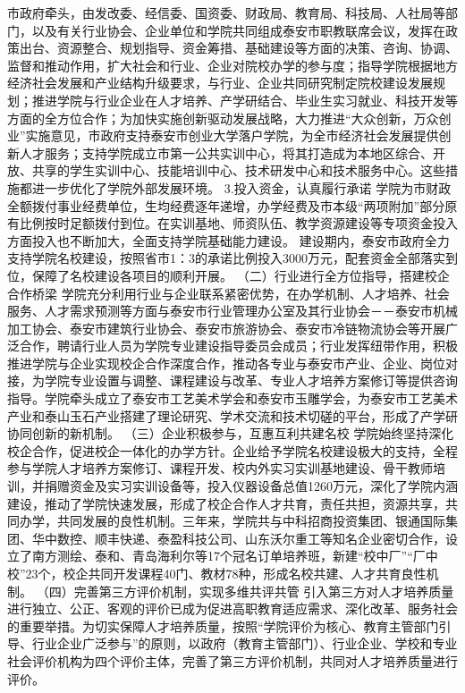 市政府牵头，由发改委、经信委、国资委、财政局、教育局、科技局、人社局等部门，以及有关行业协会、企业单位和学院共同组成泰安市职教联席会议，发挥在政策出台、资源整合、规划指导、资金筹措、基础建设等方面的决策、咨询、协调、监督和推动作用，扩大社会和行业、企业对院校办学的参与度；指导学院根据地方经济社会发展和产业结构升级要求，与行业、企业共同研究制定院校建设发展规划；推进学院与行业企业在人才培养、产学研结合、毕业生实习就业、科技开发等方面的全方位合作；为加快实施创新驱动发展战略，大力推进“大众创新，万众创业”实施意见，市政府支持泰安市创业大学落户学院，为全市经济社会发展提供创新人才服务；支持学院成立市第一公共实训中心，将其打造成为本地区综合、开放、共享的学生实训中心、技能培训中心、技术研发中心和技术服务中心。这些措施都进一步优化了学院外部发展环境。
3.投入资金，认真履行承诺
学院为市财政全额拨付事业经费单位，生均经费逐年递增，办学经费及市本级“两项附加”部分原有比例按时足额拨付到位。在实训基地、师资队伍、教学资源建设等专项资金投入方面投入也不断加大，全面支持学院基础能力建设。
建设期内，泰安市政府全力支持学院名校建设，按照省市1：3的承诺比例投入3000万元，配套资金全部落实到位，保障了名校建设各项目的顺利开展。
（二）行业进行全方位指导，搭建校企合作桥梁
学院充分利用行业与企业联系紧密优势，在办学机制、人才培养、社会服务、人才需求预测等方面与泰安市行业管理办公室及其行业协会－－泰安市机械加工协会、泰安市建筑行业协会、泰安市旅游协会、泰安市冷链物流协会等开展广泛合作，聘请行业人员为学院专业建设指导委员会成员；行业发挥纽带作用，积极推进学院与企业实现校企合作深度合作，推动各专业与泰安市产业、企业、岗位对接，为学院专业设置与调整、课程建设与改革、专业人才培养方案修订等提供咨询指导。学院牵头成立了泰安市工艺美术学会和泰安市玉雕学会，为泰安市工艺美术产业和泰山玉石产业搭建了理论研究、学术交流和技术切磋的平台，形成了产学研协同创新的新机制。
（三）企业积极参与，互惠互利共建名校
学院始终坚持深化校企合作，促进校企一体化的办学方针。企业给予学院名校建设极大的支持，全程参与学院人才培养方案修订、课程开发、校内外实习实训基地建设、骨干教师培训，并捐赠资金及实习实训设备等，投入仪器设备总值1260万元，深化了学院内涵建设，推动了学院快速发展，形成了校企合作人才共育，责任共担，资源共享，共同办学，共同发展的良性机制。三年来，学院共与中科招商投资集团、银通国际集团、华中数控、顺丰快递、泰盈科技公司、山东沃尔重工等知名企业密切合作，设立了南方测绘、泰和、青岛海利尔等17个冠名订单培养班，新建“校中厂”“厂中校”23个，校企共同开发课程40门、教材78种，形成名校共建、人才共育良性机制。
（四）完善第三方评价机制，实现多维共评共管
引入第三方对人才培养质量进行独立、公正、客观的评价已成为促进高职教育适应需求、深化改革、服务社会的重要举措。为切实保障人才培养质量，按照“学院评价为核心、教育主管部门引导、行业企业广泛参与”的原则，以政府（教育主管部门）、行业企业、学校和专业社会评价机构为四个评价主体，完善了第三方评价机制，共同对人才培养质量进行评价。
